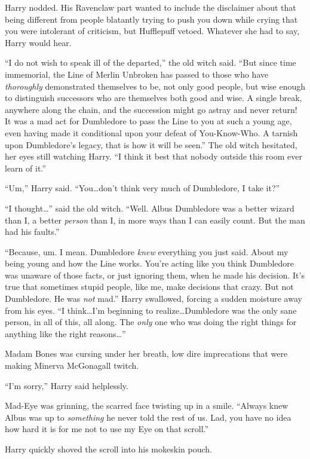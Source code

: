 Harry nodded. His Ravenclaw part wanted to include the disclaimer about that being different from people blatantly trying to push you down while crying that you were intolerant of criticism, but Hufflepuff vetoed. Whatever she had to say, Harry would hear.

“I do not wish to speak ill of the departed,” the old witch said. “But since time immemorial, the Line of Merlin Unbroken has passed to those who have \emph{thoroughly} demonstrated themselves to be, not only good people, but wise enough to distinguish successors who are themselves both good and wise. A single break, anywhere along the chain, and the succession might go astray and never return! It was a mad act for Dumbledore to pass the Line to you at such a young age, even having made it conditional upon your defeat of You-Know-Who. A tarnish upon Dumbledore’s legacy, that is how it will be seen.” The old witch hesitated, her eyes still watching Harry. “I think it best that nobody outside this room ever learn of it.”

“Um,” Harry said. “You…don’t think very much of Dumbledore, I take it?”

“I thought…” said the old witch. “Well. Albus Dumbledore was a better wizard than I, a better \emph{person} than I, in more ways than I can easily count. But the man had his faults.”

“Because, um. I mean. Dumbledore \emph{knew} everything you just said. About my being young and how the Line works. You’re acting like you think Dumbledore was unaware of those facts, or just ignoring them, when he made his decision. It’s true that sometimes stupid people, like me, make decisions that crazy. But not Dumbledore. He was \emph{not} mad.” Harry swallowed, forcing a sudden moisture away from his eyes. “I think…I’m beginning to realize…Dumbledore was the only sane person, in all of this, all along. The \emph{only} one who was doing the right things for anything like the right reasons…”

Madam Bones was cursing under her breath, low dire imprecations that were making Minerva McGonagall twitch.

“I’m sorry,” Harry said helplessly.

Mad-Eye was grinning, the scarred face twisting up in a smile. “Always knew Albus was up to \emph{something} he never told the rest of us. Lad, you have no idea how hard it is for me not to use my Eye on that scroll.”

Harry quickly shoved the scroll into his mokeskin pouch.

